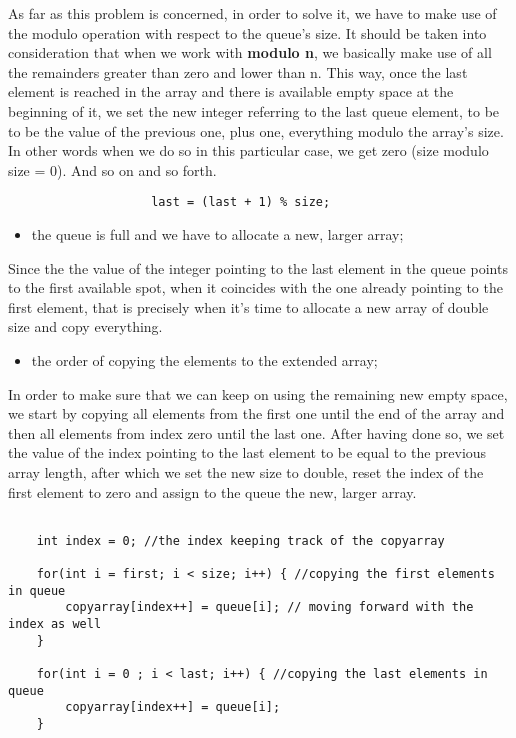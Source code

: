 \documentclass[a4paper,11pt]{article}
\begin{document}
As far as this problem is concerned, in order to solve it, we have to make use of the modulo operation with respect to the queue's size. It should be taken into consideration that when we work with \textbf{modulo n}, we basically make use of all the remainders greater than zero and lower than n. This way, once the last element is reached in the array and there is available empty space at the beginning of it, we set the new integer referring to the last queue element, to be to be the value of the previous one, plus one, everything modulo the array's size. In other words when we do so in this particular case, we get zero (size modulo size = 0). And so on and so forth.
\begin{verbatim}
                    last = (last + 1) % size;
\end{verbatim}
\begin{itemize}
\item the queue is full and we have to allocate a new, larger array;
\end{itemize}
Since the the value of the integer pointing to the last element in the queue points to the first available spot, when it coincides with the one already pointing to the first element, that is precisely when it's time to allocate a new array of double size and copy everything.

\begin{itemize}
\item the order of copying the elements to the extended array;
\end{itemize}
In order to make sure that we can keep on using the remaining new empty space, we start by copying all elements from the first one until the end of the array and then all elements from index zero until the last one. After having done so, we set the value of the index pointing to the last element to be equal to the previous array length, after which we set the new size to double, reset the index of the first element to zero and assign to the queue the new, larger array.
\begin{verbatim}

    int index = 0; //the index keeping track of the copyarray
    
    for(int i = first; i < size; i++) { //copying the first elements in queue                           
        copyarray[index++] = queue[i]; // moving forward with the index as well
    }
        
    for(int i = 0 ; i < last; i++) { //copying the last elements in queue
        copyarray[index++] = queue[i];
    }
\end{verbatim}
\end{document}
